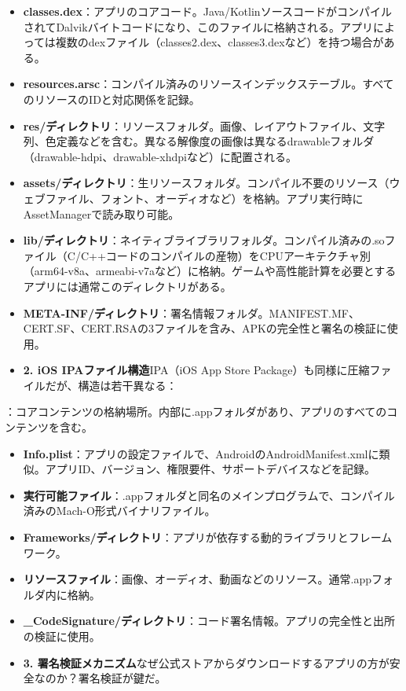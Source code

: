 \begin{itemize}
  \item \textbf{classes.dex}：アプリのコアコード。Java/KotlinソースコードがコンパイルされてDalvikバイトコードになり、このファイルに格納される。アプリによっては複数のdexファイル（classes2.dex、classes3.dexなど）を持つ場合がある。
  \item \textbf{resources.arsc}：コンパイル済みのリソースインデックステーブル。すべてのリソースのIDと対応関係を記録。
  \item \textbf{res/ディレクトリ}：リソースフォルダ。画像、レイアウトファイル、文字列、色定義などを含む。異なる解像度の画像は異なるdrawableフォルダ（drawable-hdpi、drawable-xhdpiなど）に配置される。
  \item \textbf{assets/ディレクトリ}：生リソースフォルダ。コンパイル不要のリソース（ウェブファイル、フォント、オーディオなど）を格納。アプリ実行時にAssetManagerで読み取り可能。
  \item \textbf{lib/ディレクトリ}：ネイティブライブラリフォルダ。コンパイル済みの.soファイル（C/C++コードのコンパイルの産物）をCPUアーキテクチャ別（arm64-v8a、armeabi-v7aなど）に格納。ゲームや高性能計算を必要とするアプリには通常このディレクトリがある。
  \item \textbf{META-INF/ディレクトリ}：署名情報フォルダ。MANIFEST.MF、CERT.SF、CERT.RSAの3ファイルを含み、APKの完全性と署名の検証に使用。
  \item \textbf{2. iOS IPAファイル構造}IPA（iOS App Store Package）も同様に圧縮ファイルだが、構造は若干異なる：
\end{itemize}


：コアコンテンツの格納場所。内部に.appフォルダがあり、アプリのすべてのコンテンツを含む。

\begin{itemize}
  \item \textbf{Info.plist}：アプリの設定ファイルで、AndroidのAndroidManifest.xmlに類似。アプリID、バージョン、権限要件、サポートデバイスなどを記録。
  \item \textbf{実行可能ファイル}：.appフォルダと同名のメインプログラムで、コンパイル済みのMach-O形式バイナリファイル。
  \item \textbf{Frameworks/ディレクトリ}：アプリが依存する動的ライブラリとフレームワーク。
  \item \textbf{リソースファイル}：画像、オーディオ、動画などのリソース。通常.appフォルダ内に格納。
  \item \textbf{\_CodeSignature/ディレクトリ}：コード署名情報。アプリの完全性と出所の検証に使用。
  \item \textbf{3. 署名検証メカニズム}なぜ公式ストアからダウンロードするアプリの方が安全なのか？署名検証が鍵だ。
\end{itemize}

